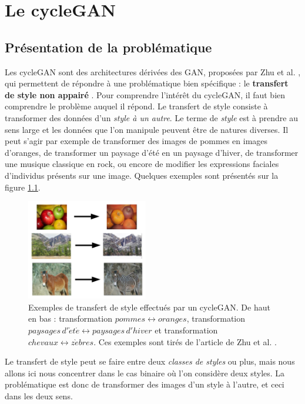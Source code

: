 \chapter{Le cycleGAN}

\section{Présentation de la problématique}


Les cycleGAN sont des architectures dérivées des GAN, proposées par Zhu et al. \cite{zhu_unpaired_2018}, qui permettent de répondre à une problématique bien spécifique : le \textbf{transfert de style non appairé} \cite{gatys_image_2016}. Pour comprendre l’intérêt du cycleGAN, il faut bien comprendre le problème auquel il répond.
Le transfert de style consiste à transformer des données d'un \textit{style à un autre}. Le terme de \textit{style} est à prendre au sens large et les données que l'on manipule peuvent être de natures diverses. Il peut s'agir par exemple de transformer des images de pommes en images d'oranges, de transformer un paysage d'été en un paysage d'hiver, de transformer une musique classique en rock, ou encore de modifier les expressions faciales d'individus présents sur une image. Quelques exemples sont présentés sur la figure \ref{cycle_exemples}.

\begin{figure}[!h]
\centering
\includegraphics[width=150pt,valign=t]{"images/cycle/cycle_exemples"}
\caption{Exemples de transfert de style effectués par un cycleGAN. De haut en bas : transformation $pommes \leftrightarrow oranges$, transformation $paysages \, d'\acute{e} t \acute{e} \leftrightarrow paysages\,d'hiver$ et transformation $chevaux \leftrightarrow z\grave{e}bres$. Ces exemples sont tirés de l'article de Zhu et al. \cite{zhu_unpaired_2018}.}
\label{cycle_exemples}
\end{figure}


Le transfert de style peut se faire entre deux \textit{classes de styles} ou plus, mais nous allons ici nous concentrer dans le cas binaire où l'on considère deux styles. La problématique est donc de transformer des images d'un style à l'autre, et ceci dans les deux sens.

